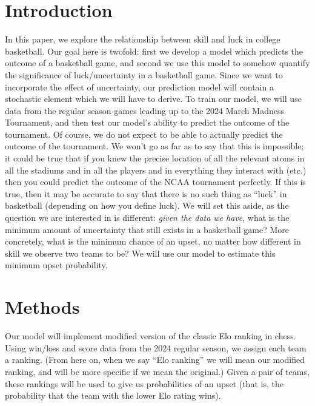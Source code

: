 \documentclass{article}
\begin{document}
\section{Introduction}
In this paper, we explore the relationship between skill and luck in college basketball. Our goal here is twofold: first we develop a model which predicts the outcome of a basketball game, and second we use this model to somehow quantify the significance of luck/uncertainty in a basketball game. Since we want to incorporate the effect of uncertainty, our prediction model will contain a stochastic element which we will have to derive. To train our model, we will use data from the regular season games leading up to the 2024 March Madness Tournament, and then test our model's ability to predict the outcome of the tournament. Of course, we do not expect to be able to actually predict the outcome of the tournament. We won't go as far as to say that this is impossible; it could be true that if you knew the precise location of all the relevant atoms in all the stadiums and in all the players and in everything they interact with (etc.) then you could predict the outcome of the NCAA tournament perfectly. If this is true, then it may be accurate to say that there is no such thing as ``luck'' in basketball (depending on how you define luck). We will set this aside, as the question we are interested in is different: \textit{given the data we have}, what is the minimum amount of uncertainty that still exists in a basketball game? More concretely, what is the minimum chance of an upset, no matter how different in skill we observe two teams to be? We will use our model to estimate this minimum upset probability.

\section{Methods}

Our model will implement modified version of the classic Elo ranking in chess. Using win/loss and score data from the 2024 regular season, we assign each team a ranking. (From here on, when we say ``Elo ranking'' we will mean our modified ranking, and will be more specific if we mean the original.) Given a pair of teams, these rankings will be used to give us probabilities of an upset (that is, the probability that the team with the lower Elo rating wins). 
\end{document}
